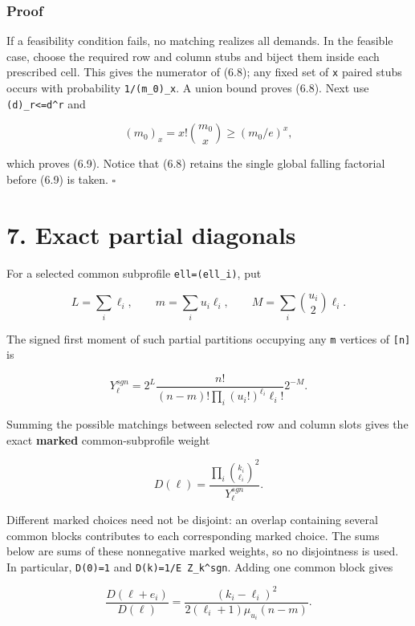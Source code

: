 \documentclass[
  11pt,
  a4paper,
]{article}
\begin{document}
\subsubsection{Proof}\label{proof-4}

If a feasibility condition fails, no matching realizes all demands. In
the feasible case, choose the required row and column stubs and biject
them inside each prescribed cell. This gives the numerator of (6.8); any
fixed set of \texttt{x} paired stubs occurs with probability
\texttt{1/(m\_0)\_x}. A union bound proves (6.8). Next use
\texttt{(d)\_r\textless{}=d\^{}r} and

\[
 (m_0)_x=x!\binom{m_0}{x}\ge(m_0/e)^x,                  \tag{6.10}
\]

which proves (6.9). Notice that (6.8) retains the single global falling
factorial before (6.9) is taken. \(\square\)

\section{7. Exact partial diagonals}\label{exact-partial-diagonals}

For a selected common subprofile \texttt{ell=(ell\_i)}, put

\[
 L=\sum_i\ell_i,\qquad
 m=\sum_i u_i\ell_i,\qquad
 M=\sum_i\binom{u_i}{2}\ell_i.                           \tag{7.1}
\]

The signed first moment of such partial partitions occupying any
\texttt{m} vertices of \texttt{{[}n{]}} is

\[
 Y_{\ell}^{sgn}
 =2^L\frac{n!}{(n-m)!\prod_i(u_i!)^{\ell_i}\ell_i!}
       2^{-M}.                                           \tag{7.2}
\]

Summing the possible matchings between selected row and column slots
gives the exact \textbf{marked} common-subprofile weight

\[
 D(\ell)=\frac{\prod_i\binom{k_i}{\ell_i}^2}
                 {Y_\ell^{sgn}}.                         \tag{7.3}
\]

Different marked choices need not be disjoint: an overlap containing
several common blocks contributes to each corresponding marked choice.
The sums below are sums of these nonnegative marked weights, so no
disjointness is used. In particular, \texttt{D(0)=1} and
\texttt{D(k)=1/E\ Z\_k\^{}sgn}. Adding one common block gives

\[
 \frac{D(\ell+e_i)}{D(\ell)}
 =\frac{(k_i-\ell_i)^2}
        {2(\ell_i+1)\mu_{u_i}(n-m)}.                     \tag{7.4}
\]
\end{document}
